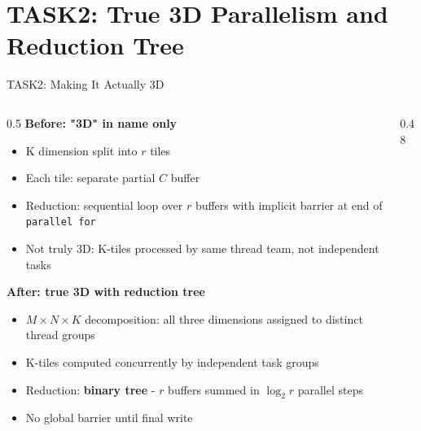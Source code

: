 \documentclass[aspectratio=169,10pt]{beamer}
\begin{document}
\section{TASK2: True 3D Parallelism and Reduction Tree}

\begin{frame}{TASK2: Making It Actually 3D}
  \begin{columns}[T]
    \begin{column}{0.5\textwidth}
      \textbf{Before: "3D" in name only}
      \begin{itemize}
        \item K dimension split into $r$ tiles
        \item Each tile: separate partial $C$ buffer
        \item \alert{Reduction: sequential loop over $r$ buffers} with implicit barrier at end of \texttt{parallel for}
        \item Not truly 3D: K-tiles processed by same thread team, not independent tasks
      \end{itemize}
      \vspace{0.3em}
      \textbf{After: true 3D with reduction tree}
      \begin{itemize}
        \item $M \times N \times K$ decomposition: all three dimensions assigned to distinct thread groups
        \item K-tiles computed concurrently by independent task groups
        \item Reduction: \textbf{binary tree} - $r$ buffers summed in $\log_2 r$ parallel steps
        \item No global barrier until final write
      \end{itemize}
    \end{column}
    \begin{column}{0.48\textwidth}
    \end{column}
  \end{columns}
\end{frame}
\end{document}
